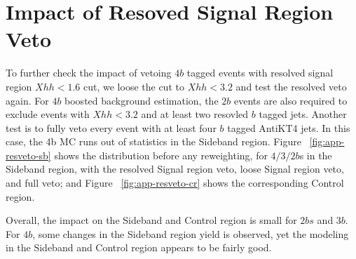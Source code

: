 \section{Impact of Resoved Signal Region Veto }
\label{app:resveto}

To further check the impact of vetoing $4b$ tagged events with resolved signal region $Xhh < 1.6$ cut, we loose the cut to $Xhh < 3.2$ and test the resolved veto again. For $4b$ boosted background estimation, the $2b$ events are also required to exclude events with $Xhh < 3.2$ and at least two resovled $b$ tagged jets. Another test is to fully veto every event with at least four $b$ tagged AntiKT4 jets. In this case, the 4b \ttbar MC runs out of statistics in the Sideband region. Figure ~\ref{fig:app-resveto-sb} shows the distribution before any reweighting, for $4/3/2b$s in the Sideband region, with the resolved Signal region veto, loose Signal region veto, and full veto; and Figure ~\ref{fig:app-resveto-cr} shows the corresponding Control region.

Overall, the impact on the Sideband and Control region is small for $2bs$ and $3b$. For $4b$, some changes in the Sideband region yield is observed, yet the modeling in the Sideband and Control region appears to be fairly good. 

